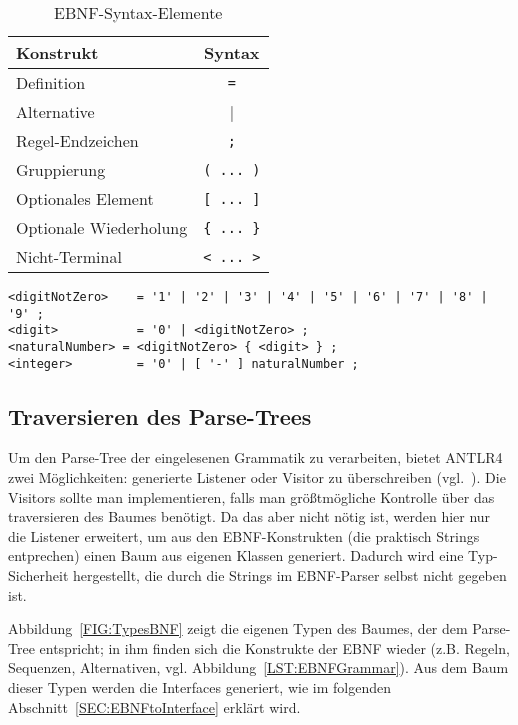 \documentclass[../InterneDSLs.tex]{subfiles}
\begin{document}
\begin{table}[ht]
\centering
\begin{tabular}{l|c}
\textbf{Konstrukt}     & \textbf{Syntax}\\\hline
Definition             & \verb|=|\\
Alternative            & |\\
Regel-Endzeichen       & \verb|;|\\
Gruppierung            & \verb|( ... )|\\
Optionales Element     & \verb|[ ... ]|\\
Optionale Wiederholung & \verb|{ ... }|\\
Nicht-Terminal         & \verb|< ... >|\\
\end{tabular}
\caption{EBNF-Syntax-Elemente}
\label{TAB:EBNFSyntax}
\end{table}

\begin{lstlisting}[caption={Zahlen in der festgelegten Notation},label={LST:EbnfNumbers}]
<digitNotZero>    = '1' | '2' | '3' | '4' | '5' | '6' | '7' | '8' | '9' ;
<digit>           = '0' | <digitNotZero> ;
<naturalNumber> = <digitNotZero> { <digit> } ;
<integer>         = '0' | [ '-' ] naturalNumber ;
\end{lstlisting}

\begin{figure}[ht]

\end{figure}

\subsection{Traversieren des Parse-Trees}
Um den Parse-Tree der eingelesenen Grammatik zu verarbeiten, bietet ANTLR4 zwei Möglichkeiten: generierte Listener oder Visitor zu überschreiben (vgl.~\cite[S. 112 ff]{Parr.2012}). Die Visitors sollte man implementieren, falls man größtmögliche Kontrolle über das traversieren des Baumes benötigt. Da das aber nicht nötig ist, werden hier nur die Listener erweitert, um aus den EBNF-Konstrukten (die praktisch Strings entprechen) einen Baum aus eigenen Klassen generiert. Dadurch wird eine Typ-Sicherheit hergestellt, die durch die Strings im EBNF-Parser selbst nicht gegeben ist.

Abbildung~\ref{FIG:TypesBNF} zeigt die eigenen Typen des Baumes, der dem Parse-Tree entspricht; in ihm finden sich die Konstrukte der EBNF wieder (z.B. Regeln, Sequenzen, Alternativen, vgl. Abbildung~\ref{LST:EBNFGrammar}). Aus dem Baum dieser Typen werden die Interfaces generiert, wie im folgenden Abschnitt~\ref{SEC:EBNFtoInterface} erklärt wird.
\end{document}
